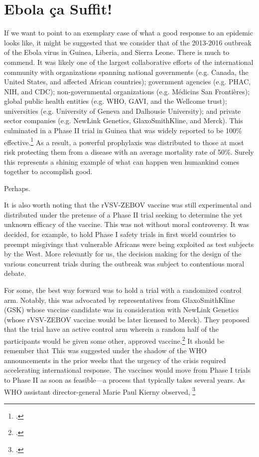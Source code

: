 \documentclass[letterpaper,notitlepage,12pt]{article}
\begin{document}
\section{Ebola \c{c}a Suffit!}

If we want to point to an exemplary case of what a good response
to an epidemic looks like, it might be suggested that we consider that of the
2013-2016 outbreak of the Ebola virus in Guinea, Liberia, and Sierra Leone.
There is much to commend.
It was likely one of the largest collaborative efforts of the international
community with organizations spanning national governments (e.g. Canada, the
United States, and affected African countries); government agencies (e.g. PHAC,
NIH, and CDC); non-governmental organizations (e.g. M\'{e}dicins San 
Fronti\`{e}res); global public health entities (e.g. WHO, GAVI, and the Wellcome
trust); universities (e.g. University of Geneva and Dalhousie University); and
private sector companies (e.g. NewLink Genetics, GlaxoSmithKline, and Merck).
This culminated in a Phase II trial in Guinea that was widely reported to be
100\% effective.\footcite{NYT}
As a result, a powerful prophylaxis was distributed to those at most risk
protecting them from a disease with an average mortality rate of 50\%.
Surely this represents a shining example of what can happen wen humankind comes
together to accomplish good.

Perhaps.

It is also worth noting that the rVSV-ZEBOV vaccine was still experimental and
distributed under the pretense of a Phase II trial seeking to determine the yet
unknown efficacy of the vaccine.
This was not without moral controversy.
It was decided, for example, to hold Phase I safety trials in first world
countries to preempt misgivings that vulnerable Africans were being exploited as
test subjects by the West.
More relevantly for us, the decision making for the design of the various
concurrent trials during the outbreak was subject to contentious moral debate.

For some, the best way forward was to hold a trial with a randomized control
arm.
Notably, this was advocated by representatives from GlaxoSmithKline (GSK) whose
vaccine candidate was in consideration with NewLink Genetics (whose rVSV-ZEBOV
vaccine would be later licensed to Merck).
They proposed that the trial have an active control arm wherein a random half of
the participants would be given some other, approved vaccine.\footcite
{Science}
It should be remember that
This was suggested under the shadow of the WHO announcements in the prior weeks  
that the urgency of the crisis required accelerating international response.
The vaccines would move from Phase I trials to Phase II as soon as feasible---a
process that typically takes several years.
As WHO assistant director-general Marie Paul Kierny
observed, \footcite{Science}
\end{document}
